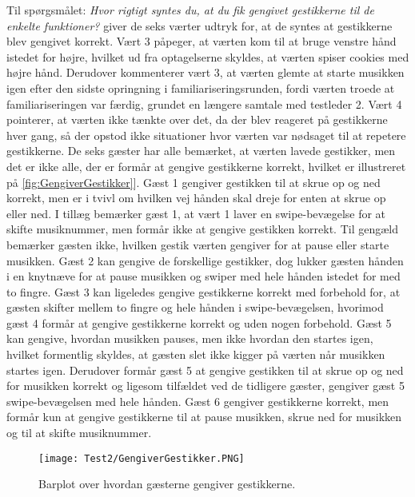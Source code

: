 Til spørgsmålet: \textit{Hvor rigtigt syntes du, at du fik gengivet gestikkerne til de enkelte funktioner?} giver de seks værter udtryk for, at de syntes at gestikkerne blev gengivet korrekt. Vært 3 påpeger, at værten kom til at bruge venstre hånd istedet for højre, hvilket ud fra optagelserne skyldes, at værten spiser cookies med højre hånd. Derudover kommenterer vært 3, at værten glemte at starte musikken igen efter den sidste opringning i familiariseringsrunden, fordi værten troede at familiariseringen var færdig, grundet en længere samtale med testleder 2. Vært 4 pointerer, at værten ikke tænkte over det, da der blev reageret på gestikkerne hver gang, så der opstod ikke situationer hvor værten var nødsaget til at repetere gestikkerne. \blankline
%
De seks gæster har alle bemærket, at værten lavede gestikker, men det er ikke alle, der er formår at gengive gestikkerne korrekt, hvilket er illustreret på \autoref{fig:GengiverGestikker}]. Gæst 1 gengiver gestikken til at skrue op og ned korrekt, men er i tvivl om hvilken vej hånden skal dreje for enten at skrue op eller ned. I tillæg bemærker gæst 1, at vært 1 laver en swipe-bevægelse for at skifte musiknummer, men formår ikke at gengive gestikken korrekt. Til gengæld bemærker gæsten ikke, hvilken gestik værten gengiver for at pause eller starte musikken. Gæst 2 kan gengive de forskellige gestikker, dog lukker gæsten hånden i en knytnæve for at pause musikken og swiper med hele hånden istedet for med to fingre. Gæst 3 kan ligeledes gengive gestikkerne korrekt med forbehold for, at gæsten skifter mellem to fingre og hele hånden i swipe-bevægelsen, hvorimod gæst 4 formår at gengive gestikkerne korrekt og uden nogen forbehold. Gæst 5 kan gengive, hvordan musikken pauses, men ikke hvordan den startes igen, hvilket formentlig skyldes, at gæsten slet ikke kigger på værten når musikken startes igen. Derudover formår gæst 5 at gengive gestikken til at skrue op og ned for musikken korrekt og ligesom tilfældet ved de tidligere gæster, gengiver gæst 5 swipe-bevægelsen med hele hånden. Gæst 6 gengiver gestikkerne korrekt, men formår kun at gengive gestikkerne til at pause musikken, skrue ned for musikken og til at skifte musiknummer. 
%
\begin{figure}[H]
	\centering
	\texttt{[image: Test2/GengiverGestikker.PNG]}
	\caption{Barplot over hvordan gæsterne gengiver gestikkerne.}
	\label{fig:GengiverGestikker}
\end{figure}
\noindent
% 
